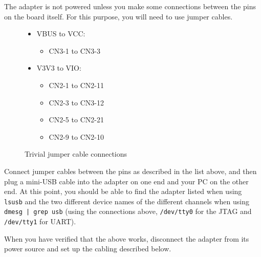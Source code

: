 \documentclass[a4paper,11pt,reqno]{amsart}
\begin{document}
{The adapter is not powered unless you make some connections between the pins on the board itself. For this purpose, you will need to use jumper cables.

\begin{figure}[hb]
\begin{center}
\begin{itemize}
\item VBUS to VCC:
		\begin{itemize}
		\item CN3-1 to CN3-3
		\end{itemize}
\item V3V3 to VIO:
		\begin{itemize}
		\item CN2-1 to CN2-11
		\item CN2-3 to CN3-12
		\item CN2-5 to CN2-21
		\item CN2-9 to CN2-10
		\end{itemize}
\end{itemize}
\end{center}
\caption{Trivial jumper cable connections}
\label{fig:con1}
\end{figure}

Connect jumper cables between the pins as described in the list above, and then plug a mini-USB cable into the adapter on one end and your PC on the other end. At this point, you should be able to find the adapter listed when using \texttt{lsusb} and the two different device names of the different channels when using \texttt{dmesg | grep usb} (using the connections above, \texttt{/dev/tty0} for the JTAG and \texttt{/dev/tty1} for UART).

When you have verified that the above works, disconnect the adapter from its power source and set up the cabling described below.

}
\end{document}
